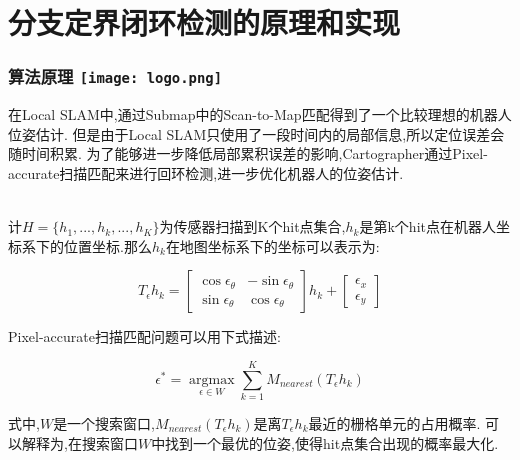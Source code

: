 \section{分支定界闭环检测的原理和实现}


\begin{comment}
1.$\epsilon = [\epsilon_x, \epsilon_y, \epsilon_\theta]^T$表示机器人在地图坐标系下的位姿.
$T_\epsilon$表示位姿估计的坐标变换.


\end{comment}
\begin{frame}
\frametitle{算法原理 \hfill \texttt{[image: logo.png]}}

在Local SLAM中,通过Submap中的Scan-to-Map匹配得到了一个比较理想的机器人位姿估计.
但是由于Local SLAM只使用了一段时间内的局部信息,所以定位误差会随时间积累.
为了能够进一步降低局部累积误差的影响,Cartographer通过Pixel-accurate扫描匹配来进行回环检测,进一步优化机器人的位姿估计.

~\\


计$H=\{h_1, ..., h_k, ..., h_K\}$为传感器扫描到K个hit点集合,$h_k$是第k个hit点在机器人坐标系下的位置坐标.那么$h_k$在地图坐标系下的坐标可以表示为:

\begin{equation}
	T_\epsilon h_k = 
	\begin{bmatrix}
	\cos{\epsilon_\theta } & -\sin\epsilon_\theta \\
	\sin\epsilon_\theta & \cos\epsilon_\theta 
	\end{bmatrix}
	h_k +
	\begin{bmatrix}
	\epsilon_x \\ \epsilon_y
	\end{bmatrix}
\end{equation}

Pixel-accurate扫描匹配问题可以用下式描述:

\begin{equation}
	\epsilon ^* = \mathop{argmax}\limits_{\epsilon \in W} \sum_{k=1}^K M_{nearest}(T_\epsilon h_k)
\end{equation}

式中,$W$是一个搜索窗口,$M_{nearest}(T_\epsilon h_k)$是离$T_\epsilon h_k$最近的栅格单元的占用概率.
可以解释为,在搜索窗口$W$中找到一个最优的位姿,使得hit点集合出现的概率最大化.




\end{frame}


